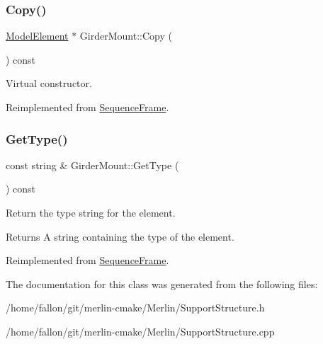 \subsubsection{\texorpdfstring{Copy()}{Copy()}}
{\footnotesize\ttfamily \hyperlink{classModelElement}{Model\+Element} $\ast$ Girder\+Mount\+::\+Copy (\begin{DoxyParamCaption}{ }\end{DoxyParamCaption}) const\hspace{0.3cm}{\ttfamily [virtual]}}

Virtual constructor. 

Reimplemented from \hyperlink{classSequenceFrame_a89a9046c330fa9955cd2e6b67b5c64f7}{Sequence\+Frame}.

\mbox{\label{classGirderMount_af23acf9dc5a5aa1bf3eb246fd6fcbca1}} 
\subsubsection{\texorpdfstring{Get\+Type()}{GetType()}}
{\footnotesize\ttfamily const string \& Girder\+Mount\+::\+Get\+Type (\begin{DoxyParamCaption}{ }\end{DoxyParamCaption}) const\hspace{0.3cm}{\ttfamily [virtual]}}

Return the type string for the element. \begin{DoxyReturn}{Returns}
A string containing the type of the element. 
\end{DoxyReturn}


Reimplemented from \hyperlink{classSequenceFrame_a062ab78de738251ac5af6c62b470edcf}{Sequence\+Frame}.



The documentation for this class was generated from the following files\+:\begin{DoxyCompactItemize}
\item 
/home/fallon/git/merlin-\/cmake/\+Merlin/Support\+Structure.\+h\item 
/home/fallon/git/merlin-\/cmake/\+Merlin/Support\+Structure.\+cpp\end{DoxyCompactItemize}
